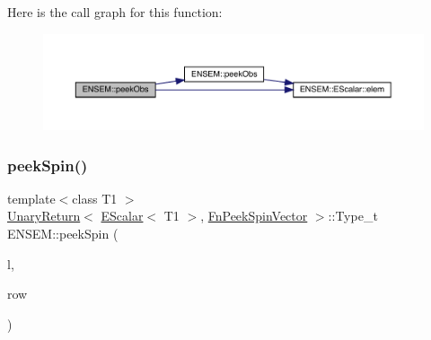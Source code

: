 Here is the call graph for this function\+:
\nopagebreak
\begin{figure}[H]
\begin{center}
\leavevmode
\includegraphics[width=350pt]{d4/dca/group__escalar_ga5715083f9573c91b9d4567559f4b2b30_cgraph}
\end{center}
\end{figure}
\mbox{\label{group__escalar_gaa833c21339250a427d537f2c3431f9e2}} 
\subsubsection{\texorpdfstring{peekSpin()}{peekSpin()}\hspace{0.1cm}{\footnotesize\ttfamily [1/2]}}
{\footnotesize\ttfamily template$<$class T1 $>$ \\
\mbox{\hyperlink{structENSEM_1_1UnaryReturn}{Unary\+Return}}$<$ \mbox{\hyperlink{classENSEM_1_1EScalar}{E\+Scalar}}$<$ T1 $>$, \mbox{\hyperlink{structENSEM_1_1FnPeekSpinVector}{Fn\+Peek\+Spin\+Vector}} $>$\+::Type\+\_\+t E\+N\+S\+E\+M\+::peek\+Spin (\begin{DoxyParamCaption}\item[{const \mbox{\hyperlink{classENSEM_1_1EScalar}{E\+Scalar}}$<$ T1 $>$ \&}]{l,  }\item[{int}]{row }\end{DoxyParamCaption})\hspace{0.3cm}{\ttfamily [inline]}}

